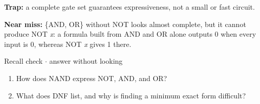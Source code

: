 \documentclass[11pt]{article}
\begin{document}
\begin{keepsection}
\begin{keepsection}
\begin{notebox}\textbf{Trap:} a complete gate set guarantees expressiveness, not a small or fast circuit.\end{notebox}

\begin{notebox}\textbf{Near miss:} \{AND, OR\} without NOT looks almost complete, but it cannot produce NOT \textit{x}: a formula built from AND and OR alone outputs 0 when every input is 0, whereas NOT \textit{x} gives 1 there.\end{notebox}

\begin{recallbox}{Recall check \ensuremath{\cdot} answer without looking}
\begin{enumerate}
\item How does NAND express NOT, AND, and OR?
\item What does DNF list, and why is finding a minimum exact form difficult?
\end{enumerate}

\end{recallbox}
\end{keepsection}
\end{keepsection}
\end{document}
